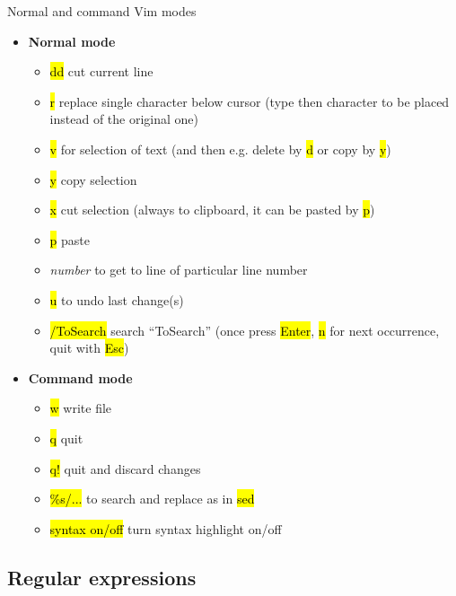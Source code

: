 \documentclass[compress, ucs, xelatex, 11pt, xcolor=svgnames, aspectratio=169,
	hyperref={
		bookmarks=true,
		unicode=true,
		colorlinks=true,
		pdftitle={Linux, command line and MetaCentrum},
		plainpages=false,
		pdfauthor={Vojtech Zeisek},
		pdfsubject={Course about use of Linux command line, writing shell scripts and using MetaCentrum of CESNET},
		pdfcreator={XeLaTeX},
		pdfkeywords={Linux, GNU, BASH, shell, command line, MetaCentrum},
		linkcolor=DarkRed, %
		anchorcolor=DarkBlue, %
		citecolor=Indigo, %
		filecolor=NavyBlue, %
		menucolor=DarkMagenta, %
		urlcolor=DarkBlue, %
		pdftex},
	url={hyphens, lowtilde} %
	]{beamer}
\renewcommand{\texttt}[1]{\hl{\ttfamily #1}}
\begin{document}
\begin{frame}{Normal and command Vim modes}
	\begin{multicols}{2}
		\begin{itemize}
			\item \textbf{Normal mode}
			\begin{itemize}
				\item \texttt{dd} cut current line
				\item \texttt{r} replace single character below cursor (type then character to be placed instead of the original one)
				\item \texttt{v} for selection of text (and then e.g. delete by \texttt{d} or copy by \texttt{y})
				\item \texttt{y} copy selection
				\item \texttt{x} cut selection (always to clipboard, it can be pasted by \texttt{p})
				\item \texttt{p} paste
				\item \textit{number} to get to line of particular line number
				\item \texttt{u} to undo last change(s)
				\item \texttt{/ToSearch} search \enquote{ToSearch} (once press \texttt{Enter}, \texttt{n} for next occurrence, quit with \texttt{Esc})
			\end{itemize}
			\item \textbf{Command mode}
			\begin{itemize}
				\item \texttt{w} write file
				\item \texttt{q} quit
				\item \texttt{q!} quit and discard changes
				\item \texttt{\%s/...} to search and replace as in \texttt{sed}
				\item \texttt{syntax on/off} turn syntax highlight on/off
			\end{itemize}
		\end{itemize}
	\end{multicols}
\end{frame}

\subsection{Regular expressions}
\end{document}
